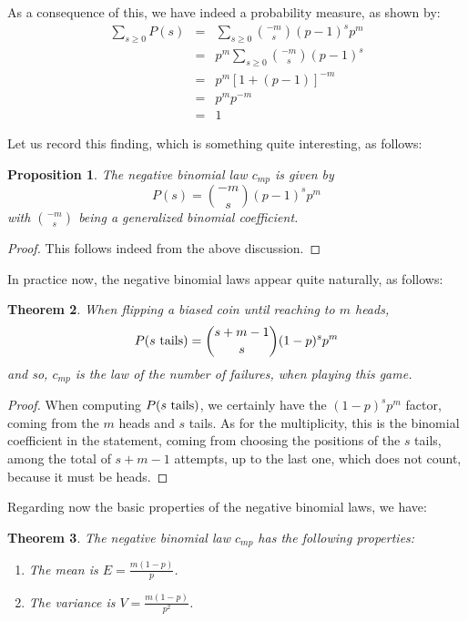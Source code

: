 \documentclass[12pt]{amsbook}
\newtheorem{theorem}{Theorem}[chapter]
\newtheorem{proposition}[theorem]{Proposition}
\begin{document}
As a consequence of this, we have indeed a probability measure, as shown by:
\begin{eqnarray*}
\sum_{s\geq0}P(s)
&=&\sum_{s\geq0}\binom{-m}{s}(p-1)^sp^m\\
&=&p^m\sum_{s\geq0}\binom{-m}{s}(p-1)^s\\
&=&p^m[1+(p-1)]^{-m}\\
&=&p^mp^{-m}\\
&=&1
\end{eqnarray*}

Let us record this finding, which is something quite interesting, as follows:


\begin{proposition}
The negative binomial law $c_{mp}$ is given by
$$P(s)=\binom{-m}{s}(p-1)^sp^m$$
with $\binom{-m}{s}$ being a generalized binomial coefficient.
\end{proposition}

\begin{proof}
This follows indeed from the above discussion.
\end{proof}

In practice now, the negative binomial laws appear quite naturally, as follows:

\begin{theorem}
When flipping a biased coin until reaching to $m$ heads,
$$P(s\ {\rm tails})=\binom{s+m-1}{s}(1-p)^sp^m$$
and so, $c_{mp}$ is the law of the number of failures, when playing this game.
\end{theorem}

\begin{proof}
When computing $P(s\ {\rm tails})$, we certainly have the $(1-p)^sp^m$ factor, coming from the $m$ heads and $s$ tails. As for the multiplicity, this is the binomial coefficient in the statement, coming from choosing the positions of the $s$ tails, among the total of $s+m-1$ attempts, up to the last one, which does not count, because it must be heads. 
\end{proof}

Regarding now the basic properties of the negative binomial laws, we have:

\begin{theorem}
The negative binomial law $c_{mp}$ has the following properties:
\begin{enumerate}
\item The mean is $E=\frac{m(1-p)}{p}$.

\item The variance is $V=\frac{m(1-p)}{p^2}$.
\end{enumerate}
\end{theorem}
\end{document}
